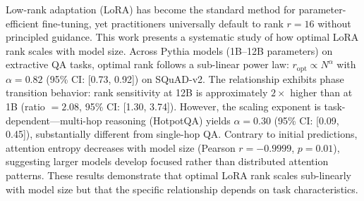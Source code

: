 
Low-rank adaptation (LoRA) has become the standard method for parameter-efficient fine-tuning, yet practitioners universally default to rank $r=16$ without principled guidance. This work presents a systematic study of how optimal LoRA rank scales with model size. Across Pythia models (1B--12B parameters) on extractive QA tasks, optimal rank follows a sub-linear power law: $r_{\text{opt}} \propto N^{\alpha}$ with $\alpha = 0.82$ (95\% CI: [0.73, 0.92]) on SQuAD-v2. The relationship exhibits phase transition behavior: rank sensitivity at 12B is approximately $2\times$ higher than at 1B (ratio $= 2.08$, 95\% CI: [1.30, 3.74]). However, the scaling exponent is task-dependent---multi-hop reasoning (HotpotQA) yields $\alpha = 0.30$ (95\% CI: [0.09, 0.45]), substantially different from single-hop QA. Contrary to initial predictions, attention entropy decreases with model size (Pearson $r = -0.9999$, $p = 0.01$), suggesting larger models develop focused rather than distributed attention patterns. These results demonstrate that optimal LoRA rank scales sub-linearly with model size but that the specific relationship depends on task characteristics.
